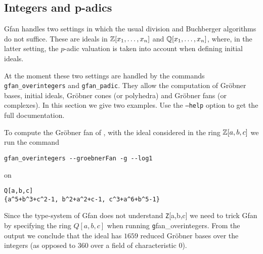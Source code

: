 %


\subsection{Integers and p-adics}
Gfan handles two settings in which the usual division and Buchberger algorithms do not suffice. These are ideals in $\mathbb{Z}[x_1,\dots,x_n]$ and $\mathbb{Q}[x_1,\dots,x_n]$, where, in the latter setting, the $p$-adic valuation is taken into account when defining initial ideals.

At the moment these two settings are handled by the commands \texttt{gfan\_overintegers} and \texttt{gfan\_padic}. They allow the computation of Gr\"obner bases, initial ideals, Gr\"obner cones (or polyhedra) and Gr\"obner fans (or complexes). In this section we give two examples. Use the \texttt{--help} option to get the full documentation.

\begin{example}
To compute the Gr\"obner fan of \cite[Example~3.9]{sturmfels}, with the ideal considered in the ring $\mathbb{Z}[a,b,c]$ we run the command
\begin{verbatim}
gfan_overintegers --groebnerFan -g --log1
\end{verbatim}
on
\begin{verbatim}
Q[a,b,c]
{a^5+b^3+c^2-1, b^2+a^2+c-1, c^3+a^6+b^5-1}
\end{verbatim}
Since the type-system of Gfan does not understand {\texttt Z[a,b,c]} we need to trick Gfan by specifying the ring $Q[a,b,c]$ when running {\texttt gfan\_overintegers}. From the output we conclude that the ideal has $1659$ reduced Gr\"obner bases over the integers (as opposed to $360$ over a field of characteristic $0$).
\end{example}

